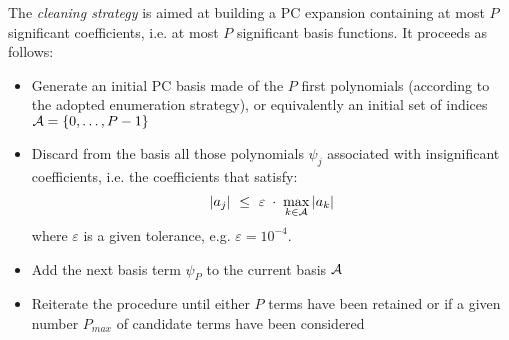 {The \emph{cleaning strategy} is aimed at building a PC expansion containing at most $P$ significant coefficients, i.e. at most $P$ significant basis functions. It proceeds as follows:
\begin{itemize}
\item Generate an initial PC basis made of the $P$ first polynomials (according to the adopted enumeration strategy), or equivalently an initial set of indices $\mathcal{A} = \{0,\dots,P-1\}$
 \item Discard from the basis all those polynomials $\psi_j$ associated with insignificant coefficients, i.e. the coefficients that satisfy:
 \begin{equation} 
    |a_j| \, \, \leq \, \, \varepsilon \; \cdot \; \max_{k \in \mathcal{A}} |a_k| 
\end{equation}
where $\varepsilon$ is a given tolerance, e.g. $\varepsilon = 10^{-4}$.
\item Add the next basis term $\psi_{P}$ to the current basis $\mathcal{A}$
\item Reiterate the procedure until either $P$ terms have been retained or if a given number $P_{max}$ of candidate terms have been considered 
\end{itemize} 

}
